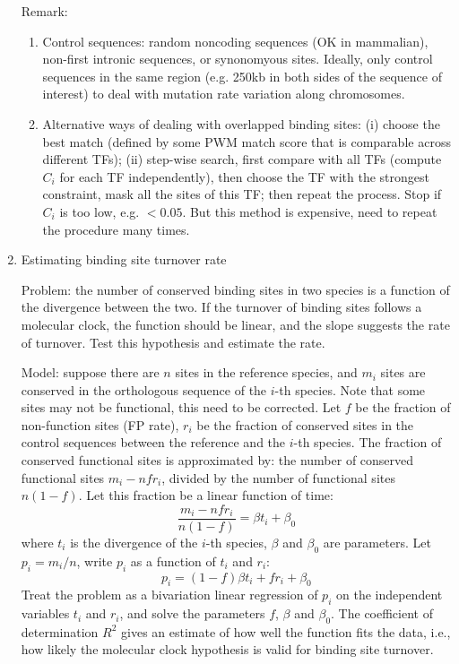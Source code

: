 \documentclass[11pt]{article}
\begin{document}
\begin{enumerate}
\begin{enumerate}
\end{enumerate}

Remark: 
\begin{enumerate}
\item Control sequences: random noncoding sequences (OK in mammalian), non-first intronic sequences, or synonomyous sites. Ideally, only control sequences in the same region (e.g. 250kb in both sides of the sequence of interest) to deal with mutation rate variation along chromosomes. 

\item Alternative ways of dealing with overlapped binding sites: (i) choose the best match (defined by some PWM match score that is comparable across different TFs); (ii) step-wise search, first compare with all TFs (compute $C_i$ for each TF independently), then choose the TF with the strongest constraint, mask all the sites of this TF; then repeat the process. Stop if $C_i$ is too low, e.g. $< 0.05$. But this method is expensive, need to repeat the procedure many times. 

\end{enumerate}

\newpage

\item{Estimating binding site turnover rate}

Problem: the number of conserved binding sites in two species is a function of the divergence between the two. If the turnover of binding sites follows a molecular clock, the function should be linear, and the slope suggests the rate of turnover. Test this hypothesis and estimate the rate. 

Model: suppose there are $n$ sites in the reference species, and $m_i$ sites are conserved in the orthologous sequence of the $i$-th species. Note that some sites may not be functional, this need to be corrected. Let $f$ be the fraction of non-function sites (FP rate), $r_i$ be the fraction of conserved sites in the control sequences between the reference and the $i$-th species. The fraction of conserved functional sites is approximated by: the number of conserved functional sites $m_i - n f r_i$, divided by the number of functional sites $n (1 - f)$. Let this fraction be a linear function of time: 
\begin{equation}
\frac{m_i - n f r_i}{n (1 - f)}	= \beta t_i + \beta_0
\end{equation}
where $t_i$ is the divergence of the $i$-th species, $\beta$ and $\beta_0$ are parameters. Let $p_i = m_i/n$, write $p_i$ as a function of $t_i$ and $r_i$: 
\begin{equation}
p_i = (1 - f) \beta t_i + f r_i + \beta_0	
\end{equation}
Treat the problem as a bivariation linear regression of $p_i$ on the independent variables $t_i$ and $r_i$, and solve the parameters $f$, $\beta$ and $\beta_0$. The coefficient of determination $R^2$ gives an estimate of how well the function fits the data, i.e., how likely the molecular clock hypothesis is valid for binding site turnover. 


\end{enumerate}
\end{document}
